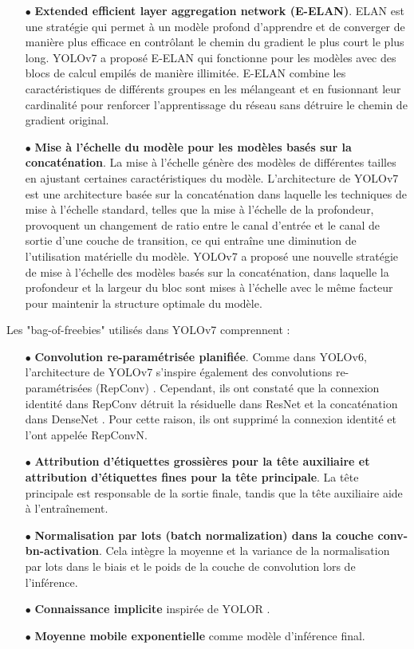 \documentclass{article}
\begin{document}
\begin{itemize}
    \item[$\bullet$] \textbf{Extended efficient layer aggregation network (E-ELAN)}. ELAN \cite{95} est une stratégie qui permet à un modèle profond d'apprendre et de converger de manière plus efficace en contrôlant le chemin du gradient le plus court le plus long. YOLOv7 a proposé E-ELAN qui fonctionne pour les modèles avec des blocs de calcul empilés de manière illimitée. E-ELAN combine les caractéristiques de différents groupes en les mélangeant et en fusionnant leur cardinalité pour renforcer l'apprentissage du réseau sans détruire le chemin de gradient original.
    \item[$\bullet$] \textbf{Mise à l'échelle du modèle pour les modèles basés sur la concaténation}. La mise à l'échelle génère des modèles de différentes tailles en ajustant certaines caractéristiques du modèle. L'architecture de YOLOv7 est une architecture basée sur la concaténation dans laquelle les techniques de mise à l'échelle standard, telles que la mise à l'échelle de la profondeur, provoquent un changement de ratio entre le canal d'entrée et le canal de sortie d'une couche de transition, ce qui entraîne une diminution de l'utilisation matérielle du modèle. YOLOv7 a proposé une nouvelle stratégie de mise à l'échelle des modèles basés sur la concaténation, dans laquelle la profondeur et la largeur du bloc sont mises à l'échelle avec le même facteur pour maintenir la structure optimale du modèle.
\end{itemize}

Les "bag-of-freebies" utilisés dans YOLOv7 comprennent :

\begin{itemize}
    \item[$\bullet$] \textbf{Convolution re-paramétrisée planifiée}. Comme dans YOLOv6, l'architecture de YOLOv7 s'inspire également des convolutions re-paramétrisées (RepConv) \cite{87}. Cependant, ils ont constaté que la connexion identité dans RepConv détruit la résiduelle dans ResNet \cite{53} et la concaténation dans DenseNet \cite{96}. Pour cette raison, ils ont supprimé la connexion identité et l'ont appelée RepConvN.
    \item[$\bullet$] \textbf{Attribution d'étiquettes grossières pour la tête auxiliaire et attribution d'étiquettes fines pour la tête principale}. La tête principale est responsable de la sortie finale, tandis que la tête auxiliaire aide à l'entraînement.
    \item[$\bullet$] \textbf{Normalisation par lots (batch normalization) dans la couche conv-bn-activation}. Cela intègre la moyenne et la variance de la normalisation par lots dans le biais et le poids de la couche de convolution lors de l'inférence.
    \item[$\bullet$] \textbf{Connaissance implicite} inspirée de YOLOR \cite{77}.
    \item[$\bullet$] \textbf{Moyenne mobile exponentielle} comme modèle d'inférence final.
\end{itemize}
\end{document}
